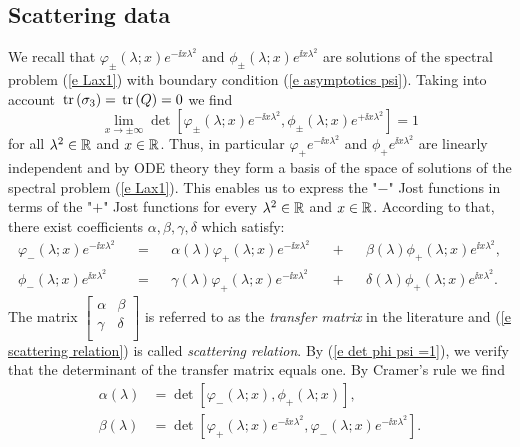 \subsection{Scattering data}\label{ss scattering data}
We recall that $\varphi_{\pm}(\lambda;x)e^{-\ii x\lambda^2}$ and $\phi_{\pm}(\lambda;x)e^{\ii x\lambda^2}$ are solutions of the spectral problem (\ref{e Lax1}) with boundary condition (\ref{e asymptotics psi}). Taking into account $\,\text{tr}\,(\sigma_3)=\,\text{tr}\,(Q)=0$ we find
\begin{equation}\label{e det phi psi =1}
    \lim_{x\to\pm\infty}\det[\varphi_{\pm} (\lambda;x)e^{-\ii x\lambda^2},\phi_{\pm}(\lambda;x)e^{+\ii x\lambda^2}]=1
\end{equation}
for all $\lambda^2\in\mathbb R$ and $x\in\mathbb R$. Thus, in particular $\varphi_{+}e^{-\ii x\lambda^2}$ and $\phi_{+}e^{\ii x\lambda^2}$ are linearly independent and by ODE theory they form a basis of the space of solutions of the spectral problem (\ref{e Lax1}). This enables us to express the "$-$" Jost functions in terms of the "$+$" Jost functions for every $\lambda^2\in\mathbb R$ and $x\in\mathbb R$. According to that, there exist coefficients $\alpha,\beta,\gamma,\delta$ which satisfy:
\begin{equation}\label{e scattering relation}
    \begin{aligned}
         \varphi_{-}(\lambda;x)e^{-\ii x\lambda^2}&&=&& \alpha(\lambda)\varphi_{+}(\lambda;x)e^{-\ii x\lambda^2} &&+&&\beta(\lambda) \phi_{+}(\lambda;x)e^{\ii x\lambda^2},\\
         \phi_{-}(\lambda;x)e^{\ii x\lambda^2}&&=&& \gamma(\lambda)\varphi_{+}(\lambda;x)e^{-\ii x\lambda^2} &&+&& \delta(\lambda) \phi_{+}(\lambda;x)e^{\ii x\lambda^2}.
    \end{aligned}
\end{equation}
The matrix
$
\left[
  \begin{array}{cc}
    \alpha & \beta \\
    \gamma & \delta \\
  \end{array}
\right]
$
is referred to as the \emph{transfer matrix} in the literature and (\ref{e scattering relation}) is called \emph{scattering relation}. By (\ref{e det phi psi =1}), we verify that the determinant of the transfer matrix equals one. By Cramer's rule we find
\begin{equation}\label{e def alpha beta}
    \begin{aligned}
        \alpha(\lambda)&=\det[\varphi_{-}(\lambda;x), \phi_{+}(\lambda;x)],\\[2pt]
        \beta(\lambda)&=\det[\varphi_{+} (\lambda;x)e^{-\ii x\lambda^2}, \varphi_{-}(\lambda;x)e^{-\ii x\lambda^2}].
    \end{aligned}
\end{equation}
